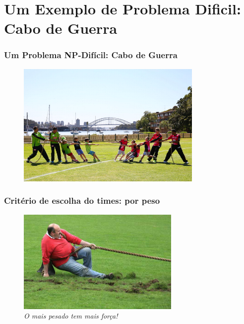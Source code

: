 \documentclass{beamer}
\begin{document}
\section{Um Exemplo de Problema Dificil: Cabo de Guerra}

\begin{frame}
\frametitle{Um Problema NP-Difícil: Cabo de Guerra}

\begin{figure}[ht!]
 \centering
 \includegraphics[width=0.8\textwidth , height=0.7\textheight]{cabo-de-guerra.jpg}
\end{figure}


\end{frame}


\begin{frame}[fragile]
\frametitle{Critério de escolha do times: por peso}

\begin{figure}[ht!]
 \centering
 \includegraphics[width=0.7\textwidth , height=0.7\textheight]{separar_por_peso02.jpg}
\caption{\textit{O mais pesado tem mais força!}} 
\end{figure}

\end{frame}
\end{document}
